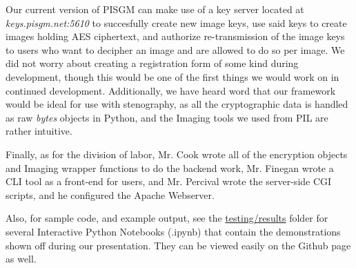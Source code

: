 \documentclass[12pt]{article}
\begin{document}
\begin{FlushLeft}
			Our current version of PISGM can make use of a key server located at \linebreak \textit{keys.pisgm.net:5610} to succesfully create new image keys, use said keys to create images holding AES ciphertext, and authorize re-transmission of the image keys to users who want to decipher an image and are allowed to do so per image.
			We did not worry about creating a registration form of some kind during development, though this would be one of the first things we would work on in continued \linebreak development.
			Additionally, we have heard word that our framework would be ideal for use with stenography, as all the cryptographic data is handled as raw \textit{bytes} objects in Python, and the Imaging tools we used from PIL are rather intuitive.
			\linebreak

			Finally, as for the division of labor, Mr. Cook wrote all of the encryption objects and Imaging wrapper functions to do the backend work, Mr. Finegan wrote a CLI tool as a front-end for users, and Mr. Percival wrote the server-side CGI scripts, and he configured the Apache Webserver.
			\linebreak

			Also, for sample code, and example output, see the \underline{testing/results} folder for several Interactive Python Notebooks (.ipynb) that contain the demonstrations shown off during our presentation.
			They can be viewed easily on the Github page as well.
	\end{FlushLeft}
\end{document}
